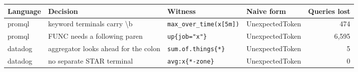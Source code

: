 \begin{tabular}{@{}llllr@{}}
\toprule
Language & Decision & Witness & Naive form & Queries lost \\
\midrule
promql & keyword terminals carry \textbackslash{}b & \texttt{max\_over\_time(x[5m])} & UnexpectedToken & 474 \\
promql & FUNC needs a following paren & \texttt{up\{job="x"\}} & UnexpectedToken & 6,595 \\
datadog & aggregator looks ahead for the colon & \texttt{sum.of.things\{*\}} & UnexpectedToken & 5 \\
datadog & no separate STAR terminal & \texttt{avg:x\{*-zone\}} & UnexpectedToken & 0 \\
\bottomrule
\end{tabular}
